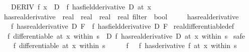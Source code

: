 \begin{isabellebody}
\ \ \ {\isachardoublequoteopen}DERIV\ f\ x\ {\isacharcolon}{\kern0pt}{\isachargreater}{\kern0pt}\ D\ {\isasymequiv}\ {\isacharparenleft}{\kern0pt}f\ has{\isacharunderscore}{\kern0pt}field{\isacharunderscore}{\kern0pt}derivative\ D{\isacharparenright}{\kern0pt}\ {\isacharparenleft}{\kern0pt}at\ x{\isacharparenright}{\kern0pt}{\isachardoublequoteclose}\isanewline
\isanewline
{}\isamarkupfalse%
\ has{\isacharunderscore}{\kern0pt}real{\isacharunderscore}{\kern0pt}derivative\ {\isacharcolon}{\kern0pt}{\isacharcolon}{\kern0pt}\ {\isachardoublequoteopen}{\isacharparenleft}{\kern0pt}real\ {\isasymRightarrow}\ real{\isacharparenright}{\kern0pt}\ {\isasymRightarrow}\ real\ {\isasymRightarrow}\ real\ filter\ {\isasymRightarrow}\ bool{\isachardoublequoteclose}\isanewline
\ \ \ \ {\isacharparenleft}{\kern0pt}\ {\isachardoublequoteopen}{\isacharparenleft}{\kern0pt}has{\isacharprime}{\kern0pt}{\isacharunderscore}{\kern0pt}real{\isacharprime}{\kern0pt}{\isacharunderscore}{\kern0pt}derivative{\isacharparenright}{\kern0pt}{\isachardoublequoteclose}\ {}{}{\isacharparenright}{\kern0pt}\isanewline
\ \ \ {\isachardoublequoteopen}{\isacharparenleft}{\kern0pt}f\ has{\isacharunderscore}{\kern0pt}real{\isacharunderscore}{\kern0pt}derivative\ D{\isacharparenright}{\kern0pt}\ F\ {\isasymequiv}\ {\isacharparenleft}{\kern0pt}f\ has{\isacharunderscore}{\kern0pt}field{\isacharunderscore}{\kern0pt}derivative\ D{\isacharparenright}{\kern0pt}\ F{\isachardoublequoteclose}\isanewline
\isanewline
{}\isamarkupfalse%
\ real{\isacharunderscore}{\kern0pt}differentiable{\isacharunderscore}{\kern0pt}def{\isacharcolon}{\kern0pt}\isanewline
\ \ {\isachardoublequoteopen}f\ differentiable\ at\ x\ within\ s\ {\isasymlongleftrightarrow}\ {\isacharparenleft}{\kern0pt}{\isasymexists}D{\isachardot}{\kern0pt}\ {\isacharparenleft}{\kern0pt}f\ has{\isacharunderscore}{\kern0pt}real{\isacharunderscore}{\kern0pt}derivative\ D{\isacharparenright}{\kern0pt}\ {\isacharparenleft}{\kern0pt}at\ x\ within\ s{\isacharparenright}{\kern0pt}{\isacharparenright}{\kern0pt}{\isachardoublequoteclose}\isanewline
%
\isadelimproof
%
\endisadelimproof
%
\isatagproof
{}\isamarkupfalse%
\ safe\isanewline
\ \ \isamarkupfalse%
\ {\isachardoublequoteopen}f\ differentiable\ at\ x\ within\ s{\isachardoublequoteclose}\isanewline
\ \ \isamarkupfalse%
\ \isamarkupfalse%
\ f{\isacharprime}{\kern0pt}\ \ {\isacharasterisk}{\kern0pt}{\isacharcolon}{\kern0pt}\ {\isachardoublequoteopen}{\isacharparenleft}{\kern0pt}f\ has{\isacharunderscore}{\kern0pt}derivative\ f{\isacharprime}{\kern0pt}{\isacharparenright}{\kern0pt}\ {\isacharparenleft}{\kern0pt}at\ x\ within\ s{\isacharparenright}{\kern0pt}{\isachardoublequoteclose}\isanewline

\end{isabellebody}
